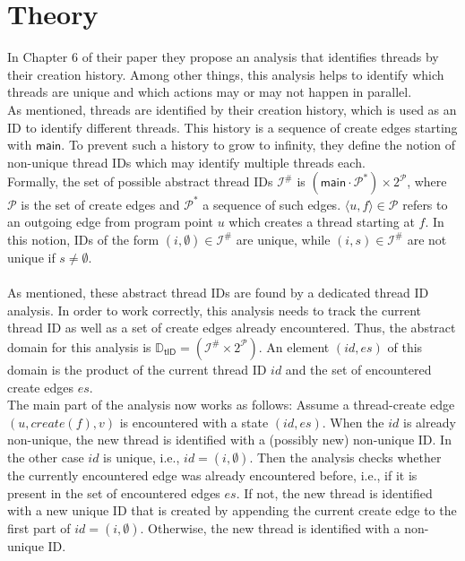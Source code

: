   \section{Theory}\label{sec:threadTheory}
  In Chapter 6 of their paper \parencite{schwarz2023clustered} they propose an analysis that identifies threads by their creation history. Among other things, this analysis helps to identify which threads are unique and which actions may or may not happen in parallel.\\
  As mentioned, threads are identified by their creation history, which is used as an ID to identify different threads. This history is a sequence of create edges starting with $\textsf{main}$. To prevent such a history to grow to infinity, they define the notion of non-unique thread IDs which may identify multiple threads each.\\
  Formally, the set of possible abstract thread IDs $\mathcal{I}^{\#}$ is $(\textsf{main}\cdot\mathcal{P}^*) \times 2^{\mathcal{P}}$, where $\mathcal{P}$ is the set of create edges and $\mathcal{P}^*$ a sequence of such edges. $\langle u, f \rangle \in \mathcal{P}$ refers to an outgoing edge from program point $u$ which creates a thread starting at $f$.
  In this notion, IDs of the form $(i, \emptyset) \in \mathcal{I}^{\#}$ are unique, while $(i, s) \in \mathcal{I}^{\#}$ are not unique if $s \neq \emptyset$.\\
  \\
  As mentioned, these abstract thread IDs are found by a dedicated thread ID analysis. In order to work correctly, this analysis needs to track the current thread ID as well as a set of create edges already encountered. Thus, the abstract domain for this analysis is $\mathbb{D}_\textsf{tID} = (\mathcal{I}^{\#} \times 2^{\mathcal{P}})$. An element $(id, es)$ of this domain is the product of the current thread ID $id$ and the set of encountered create edges $es$.\\
  The main part of the analysis now works as follows: Assume a thread-create edge $(u, create(f), v)$ is encountered with a state $(id, es)$. When the $id$ is already non-unique, the new thread is identified with a (possibly new) non-unique ID. In the other case $id$ is unique, i.e., $id = (i, \emptyset)$. Then the analysis checks whether the currently encountered edge was already encountered before, i.e., if it is present in the set of encountered edges $es$. If not, the new thread is identified with a new unique ID that is created by appending the current create edge to the first part of $id = (i, \emptyset)$. Otherwise, the new thread is identified with a non-unique ID.\\
